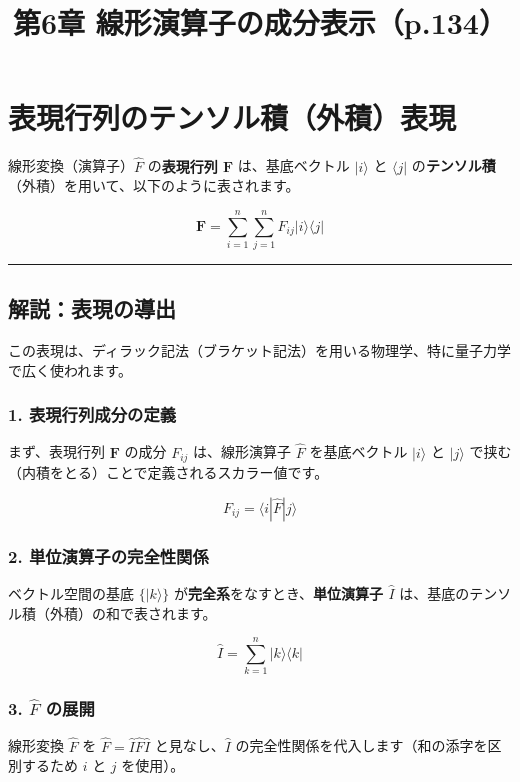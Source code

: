 \documentclass{ltjsarticle}
\begin{document}
\title{第6章 線形演算子の成分表示（p.134）}
\maketitle %

\section*{表現行列のテンソル積（外積）表現}

線形変換（演算子）$\hat{F}$ の\textbf{表現行列 $\mathbf{F}$} は、基底ベクトル $|i\rangle$ と $\langle j|$ の\textbf{テンソル積}（外積）を用いて、以下のように表されます。

$$
\mathbf{F} = \sum_{i=1}^{n} \sum_{j=1}^{n} F_{ij} |i\rangle \langle j|
$$

\hrule

\subsection*{解説：表現の導出}

この表現は、ディラック記法（ブラケット記法）を用いる物理学、特に量子力学で広く使われます。

\subsubsection*{1. 表現行列成分の定義}

まず、表現行列 $\mathbf{F}$ の成分 $F_{ij}$ は、線形演算子 $\hat{F}$ を基底ベクトル $|i\rangle$ と $|j\rangle$ で挟む（内積をとる）ことで定義されるスカラー値です。

$$
F_{ij} = \langle i|\hat{F}|j\rangle
$$

\subsubsection*{2. 単位演算子の完全性関係}

ベクトル空間の基底 $\{|k\rangle\}$ が\textbf{完全系}をなすとき、\textbf{単位演算子 $\hat{I}$} は、基底のテンソル積（外積）の和で表されます。

$$
\hat{I} = \sum_{k=1}^{n} |k\rangle \langle k|
$$

\subsubsection*{3. $\hat{F}$ の展開}

線形変換 $\hat{F}$ を $\hat{F} = \hat{I} \hat{F} \hat{I}$ と見なし、$\hat{I}$ の完全性関係を代入します（和の添字を区別するため $i$ と $j$ を使用）。
\end{document}

